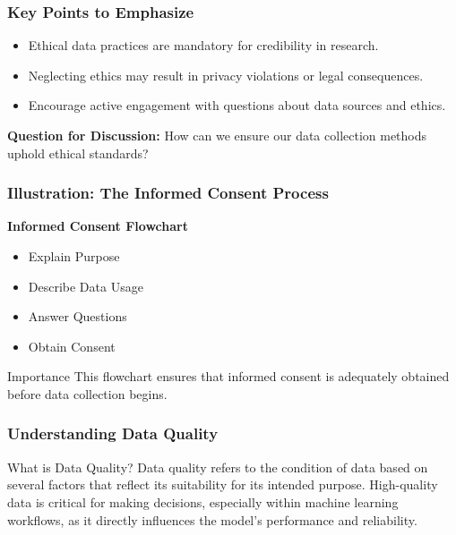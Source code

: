 \documentclass[aspectratio=169]{beamer}
\begin{document}
\begin{frame}[fragile]
    \frametitle{Key Points to Emphasize}
    \begin{itemize}
        \item Ethical data practices are mandatory for credibility in research.
        \item Neglecting ethics may result in privacy violations or legal consequences.
        \item Encourage active engagement with questions about data sources and ethics.
    \end{itemize}
    
    \textbf{Question for Discussion:} 
    How can we ensure our data collection methods uphold ethical standards?
\end{frame}

\begin{frame}[fragile]
    \frametitle{Illustration: The Informed Consent Process}
    \begin{center}
        \textbf{Informed Consent Flowchart}
    \end{center}
    \begin{itemize}
        \item Explain Purpose 
        \item Describe Data Usage 
        \item Answer Questions 
        \item Obtain Consent
    \end{itemize}
    \begin{block}{Importance}
        This flowchart ensures that informed consent is adequately obtained before data collection begins.
    \end{block}
\end{frame}

\begin{frame}[fragile]
    \frametitle{Understanding Data Quality}
    \begin{block}{What is Data Quality?}
        Data quality refers to the condition of data based on several factors 
        that reflect its suitability for its intended purpose. High-quality data 
        is critical for making decisions, especially within machine learning 
        workflows, as it directly influences the model’s performance and reliability.
    \end{block}
\end{frame}
\end{document}
